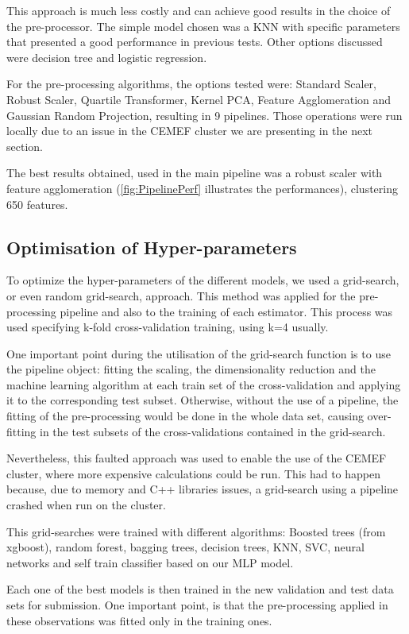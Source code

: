 \documentclass[letterpaper,11pt]{article}
\begin{document}
This approach is much less costly and can achieve good results in the choice of the pre-processor. The simple model chosen was a KNN with specific parameters that presented a good performance in previous tests. Other options discussed were decision tree and logistic regression.

For the pre-processing algorithms, the options tested were: Standard Scaler, Robust Scaler, Quartile Transformer, Kernel PCA, Feature Agglomeration and Gaussian Random Projection, resulting in 9 pipelines. Those operations were run locally due to an issue in the CEMEF cluster we are presenting in the next section.

The best results obtained, used in the main pipeline was a robust scaler with feature agglomeration (\ref{fig:PipelinePerf} illustrates the performances), clustering 650 features.


\subsection{Optimisation of Hyper-parameters}

To optimize the hyper-parameters of the different models, we used a grid-search, or even random grid-search, approach. This method was applied for the pre-processing pipeline and also to the training of each estimator. This process was used specifying k-fold cross-validation training, using k=4 usually.

One important point during the utilisation of the grid-search function is to use the pipeline object: fitting the scaling, the dimensionality reduction and the machine learning algorithm at each train set of the cross-validation and applying it to the corresponding test subset. Otherwise, without the use of a pipeline, the fitting of the pre-processing would be done in the whole data set, causing over-fitting in the test subsets of the cross-validations contained in the grid-search.

Nevertheless, this faulted approach was used to enable the use of the CEMEF cluster, where more expensive calculations could be run. This had to happen because, due to memory and C++ libraries issues, a grid-search using a pipeline crashed when run on the cluster.

This grid-searches were trained with different algorithms: Boosted trees (from xgboost), random forest, bagging trees, decision trees, KNN, SVC, neural networks and self train classifier based on our MLP model.

Each one of the best models is then trained in the new validation and test data sets for submission. One important point, is that the pre-processing applied in these observations was fitted only in the training ones.
\end{document}
